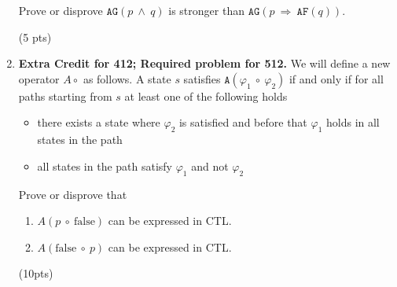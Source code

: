 \documentclass[11pt]{article}
\newcommand{\af}[1]{\texttt{AF}(#1)}
\newcommand{\ag}[1]{\texttt{AG}(#1)}
\begin{document}
\begin{enumerate}
Prove or disprove $\ag{p\ \land\ q}$ is stronger than $\ag{p\ \Rightarrow\ \af{q}}$.


\hfill (5 pts)

\item \textbf{Extra Credit for 412; Required problem for 512.}
  We will define a new operator $A\circ$
  as follows. A state $s$ satisfies $\texttt{A}(\varphi_1\ \circ\ \varphi_2)$
  if and only if for all paths starting from $s$ at least one of the
  following holds
\begin{itemize}
\item there exists a state where $\varphi_2$ is
  satisfied and before that $\varphi_1$ holds in all states in the
  path
\item all states in the path satisfy $\varphi_1$ and not
  $\varphi_2$
\end{itemize}
Prove or disprove that 
\begin{enumerate}
\item $A(p\ \circ\ \mbox{false})$ can be expressed
  in CTL.

\item $A(\mbox{false}\ \circ\ p)$ can be expressed in CTL.

\end{enumerate}
\hfill(10pts)
\end{enumerate}
\end{document}
